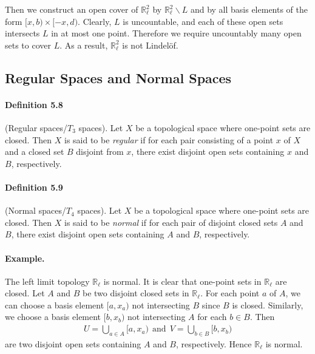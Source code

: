 \documentclass{article}
\numberwithin{equation}{section}
\theoremstyle{plain}
\theoremstyle{definition}
\begin{document}
Then we construct an open cover of $\mathbb{R}_\ell^2$ by $\mathbb{R}_\ell^2\backslash L$ and by all basis elements of the form $[x,b)\times[-x,d)$. Clearly, $L$ is uncountable, and each of these open sets intersects $L$ in at most one point. Therefore we require uncountably many open sets to cover $L$. As a result, $\mathbb{R}_\ell^2$ is not Lindelöf.

\subsection{Regular Spaces and Normal Spaces}
\paragraph{Definition 5.8} (Regular spaces/$T_3$ spaces). Let $X$ be a topological space where one-point sets are closed. Then $X$ is said to be \textit{regular} if for each pair consisting of a point $x$ of $X$ and a closed set $B$ disjoint from $x$, there exist disjoint open sets containing $x$ and $B$, respectively.

\paragraph{Definition 5.9\label{def:5.9}} (Normal spaces/$T_4$ spaces). Let $X$ be a topological space where one-point sets are closed. Then $X$ is said to be \textit{normal} if for each pair of disjoint closed sets $A$ and $B$, there exist disjoint open sets containing $A$ and $B$, respectively.

\paragraph{Example.} The left limit topology $\mathbb{R}_\ell$ is normal. It is clear that one-point sets in $\mathbb{R}_\ell$ are closed. Let $A$ and $B$ be two disjoint closed sets in $\mathbb{R}_\ell$. For each point $a$ of $A$, we can choose a basis element $[a,x_a)$ not intersecting $B$ since $B$ is closed. Similarly, we choose a basis element $[b,x_b)$ not intersecting $A$ for each $b\in B$. Then
\begin{align*}
	U=\bigcup_{a\in A}[a,x_a)\ \ \text{and}\ \ V=\bigcup_{b\in B}[b,x_b)
\end{align*}
are two disjoint open sets containing $A$ and $B$, respectively. Hence $\mathbb{R}_\ell$ is normal.
\end{document}
